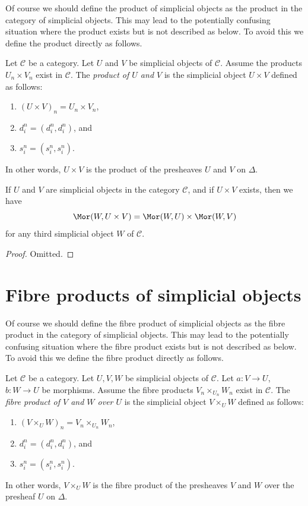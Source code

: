 \noindent
Of course we should define the product of simplicial objects
as the product in the category of simplicial objects. This
may lead to the potentially confusing situation where the product exists
but is not described as below. To avoid this we define the product
directly as follows.

\begin{definition}
\label{definition-product}
Let $\mathcal{C}$ be a category.
Let $U$ and $V$ be simplicial objects of $\mathcal{C}$.
Assume the products $U_n \times V_n$ exist in $\mathcal{C}$.
The {\it product of $U$ and $V$} is the simplicial object
$U \times V$ defined as follows:
\begin{enumerate}
\item $(U \times V)_n = U_n \times V_n$,
\item $d^n_i = (d^n_i, d^n_i)$, and
\item $s^n_i = (s^n_i, s^n_i)$.
\end{enumerate}
In other words, $U \times V$ is the product of the presheaves
$U$ and $V$ on $\Delta$.
\end{definition}

\begin{lemma}
\label{lemma-product}
If $U$ and $V$ are simplicial objects in the category $\mathcal{C}$,
and if $U \times V$ exists, then we have
$$
\Mor(W, U \times V) =
\Mor(W, U) \times
\Mor(W, V)
$$
for any third simplicial object $W$ of $\mathcal{C}$.
\end{lemma}

\begin{proof}
Omitted.
\end{proof}


\section{Fibre products of simplicial objects}
\label{section-fibre-products}

\noindent
Of course we should define the fibre product of simplicial objects
as the fibre product in the category of simplicial objects. This
may lead to the potentially confusing situation where the
fibre product exists but is not described as below. To avoid
this we define the fibre product directly as follows.

\begin{definition}
\label{definition-fibre-product}
Let $\mathcal{C}$ be a category.
Let $U, V, W$ be simplicial objects of $\mathcal{C}$.
Let $a : V \to U$, $b : W \to U$ be morphisms.
Assume the fibre products $V_n \times_{U_n} W_n$ exist in $\mathcal{C}$.
The {\it fibre product of $V$ and $W$ over $U$} is the simplicial object
$V \times_U W$ defined as follows:
\begin{enumerate}
\item $(V \times_U W)_n = V_n \times_{U_n} W_n$,
\item $d^n_i = (d^n_i, d^n_i)$, and
\item $s^n_i = (s^n_i, s^n_i)$.
\end{enumerate}
In other words, $V \times_U W$ is the fibre product of the presheaves
$V$ and $W$ over the presheaf $U$ on $\Delta$.
\end{definition}

